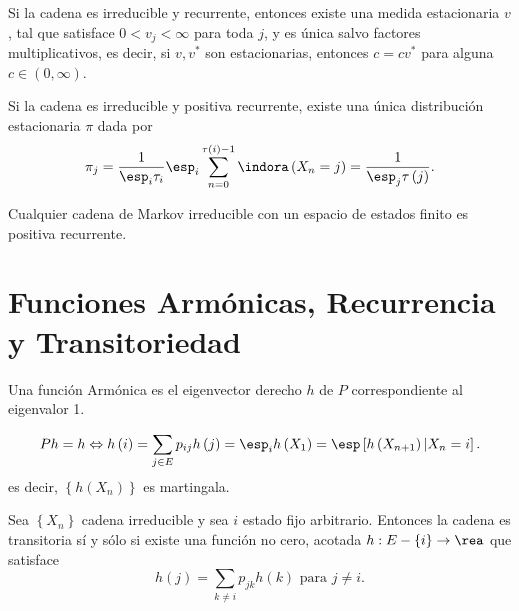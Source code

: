 \begin{Teo}\label{Teo.3.3}
Si la cadena es irreducible y recurrente, entonces existe una medida estacionaria $v$, tal que satisface $0<v_{j}<\infty$ para toda $j$, y es \'unica salvo factores multiplicativos, es decir, si $v,v^{*}$ son estacionarias, entonces $c=cv^{*}$ para alguna $c\in\left(0,\infty\right)$.
\end{Teo}

\begin{Cor}\label{Cor.3.5}
Si la cadena es irreducible y positiva recurrente, existe una
\'unica distribuci\'on estacionaria $\pi$ dada por
\begin{equation}
\pi_{j}=\frac{1}{\esp_{i}\tau_{i}}\esp_{i}\sum_{n=0}^{\tau\left(i\right)-1}\indora\left(X_{n}=j\right)=\frac{1}{\esp_{j}\tau\left(j\right)}.
\end{equation}
\end{Cor}

\begin{Cor}\label{Cor.3.6}
Cualquier cadena de Markov irreducible con un espacio de estados finito es positiva recurrente.
\end{Cor}
%
\section{Funciones Arm\'onicas, Recurrencia y Transitoriedad}
%
\begin{Def}\label{Def.Armonica}
Una funci\'on Arm\'onica es el eigenvector derecho $h$ de $P$ correspondiente al eigenvalor 1.
\end{Def}
\begin{eqnarray*}
Ph=h\Leftrightarrow h\left(i\right)=\sum_{j\in E}p_{ij}h\left(j\right)=\esp_{i}h\left(X_{1}\right)=\esp\left[h\left(X_{n+1}\right)|X_{n}=i\right].
\end{eqnarray*}
es decir, $\left\{h\left(X_{n}\right)\right\}$ es martingala.
\begin{Prop}\label{Prop.5.2}
Sea $\left\{X_{n}\right\}$ cadena irreducible  y sea $i$ estado fijo arbitrario. Entonces la cadena es transitoria s\'i y s\'olo si existe una funci\'on no cero, acotada $h:E-\left\{i\right\}\rightarrow\rea$ que satisface
\begin{equation}\label{Eq.5.1}
h\left(j\right)=\sum_{k\neq i}p_{jk}h\left(k\right)\textrm{   para }j\neq i.
\end{equation}
\end{Prop}

